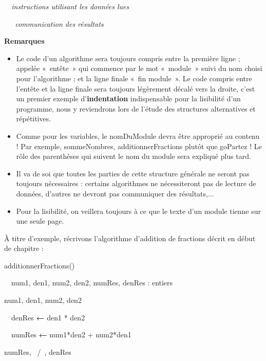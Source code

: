 {\sffamily\itshape
\ \ instructions utilisant les données lues}

{\sffamily\itshape
\ \ \ communication des résultats}

{\sffamily
{} }


\bigskip

{\bfseries
Remarques}

\liststyleListv
\begin{itemize}
\item {
Le code d'un algorithme sera toujours compris entre la
première ligne ; appelée «~entête~» qui commence par le mot «~module~»
suivi du nom choisi pour l'algorithme ; et la ligne
finale «~fin module~». Le code compris entre l'entête
et la ligne finale sera toujours légèrement décalé vers la droite,
c'est un premier exemple
d'\textbf{indentation} indispensable pour la
lisibilité d'un programme, nous y reviendrons lors de
l'étude des structures alternatives et répétitives.}
\item {
Comme pour les variables, le nomDuModule devra être approprié au contenu
! Par exemple, sommeNombres, additionnerFractions plutôt que goPartez
!
Le rôle des parenthèses qui suivent le nom du module sera expliqué plus
tard.}
\item {
Il va de soi que toutes les parties de cette structure générale ne
seront pas toujours nécessaires : certains algorithmes ne nécessiteront
pas de lecture de données, d'autres ne devront pas
communiquer des résultats,...}
\item {
Pour la lisibilité, on veillera toujours à ce que le texte d’un module
tienne sur une seule page.}
\end{itemize}
{
À titre d’exemple, récrivons l’algorithme d’addition de fractions décrit
en début de chapitre :}

{\sffamily
{} additionnerFractions()}

{\sffamily
\ \ num1, den1, num2, den2, numRes, denRes : entiers}

{\sffamily
{} num1, den1, num2, den2}

{\sffamily
{\ \ denRes
}{\textbf{←}}{ den1 *
den2}}

{\sffamily
{\ \ numRes
}{\textbf{←}}{
num1*den2 + num2*den1}}

{\sffamily
{} numRes, {\textquotedbl}~/~{\textquotedbl},
denRes}

{\sffamily
{} }


